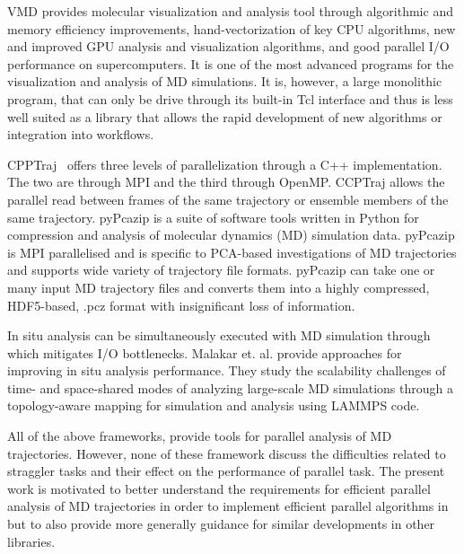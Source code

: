 VMD \cite{Hum96, VMD2013}  provides molecular visualization and analysis tool through algorithmic and memory efficiency improvements, hand-vectorization of key CPU algorithms, new and improved GPU analysis and visualization algorithms, and good parallel I/O performance on supercomputers. It is one of the most advanced programs for the visualization and analysis of MD simulations. It is, however, a large monolithic program, that can only be drive through its built-in Tcl interface and thus is less well suited as a library that allows the rapid development of new algorithms or integration into workflows.


CPPTraj~\cite{cpptraj-2013} offers three levels of parallelization through a C++ implementation. The two are through MPI and the third through OpenMP.
CCPTraj allows the parallel read between frames of the same trajectory or ensemble members of the same trajectory. 
pyPcazip \cite{pyPcazip} is a suite of software tools written in Python for compression and analysis of molecular dynamics (MD) simulation data. 
pyPcazip is MPI parallelised and is specific to PCA-based investigations of MD trajectories and supports wide variety of trajectory file formats.
pyPcazip can take one or many input MD trajectory files and converts them into a highly compressed, HDF5-based, .pcz format with insignificant loss of information.

In situ analysis can be simultaneously executed with MD simulation through which mitigates I/O bottlenecks.
Malakar et. al. \cite{Malakar-etal} provide approaches for improving in situ analysis performance. 
They study the scalability challenges of time- and space-shared modes of analyzing large-scale MD simulations through a topology-aware mapping for simulation and analysis using LAMMPS code.

All of the above frameworks, provide tools for parallel analysis of MD trajectories. 
However, none of these framework discuss the difficulties related to straggler tasks and their effect on the performance of parallel task.
The present work is motivated to better understand the requirements for efficient parallel analysis of MD trajectories in order to implement efficient parallel algorithms in  but to also provide more generally guidance for similar developments in other libraries.


